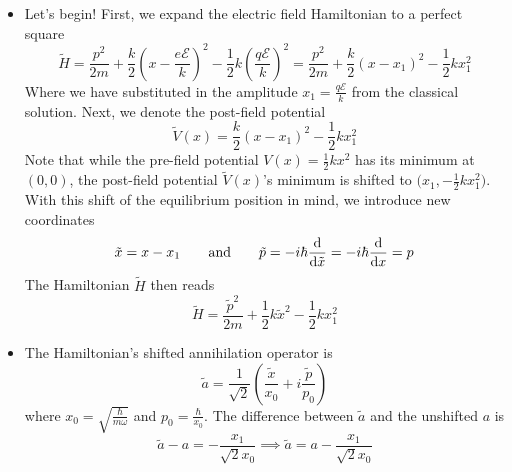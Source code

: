\documentclass[11pt, a4paper]{article}
\newcommand{\eqtext}[1]{\qquad \text{#1} \qquad}
\begin{document}
\begin{itemize}
	\item Let's begin! First, we expand the electric field Hamiltonian to a perfect square
	\begin{equation*}
		\tilde{H} = \frac{p^{2}}{2m} + \frac{k}{2}\left(x - \frac{e\mathcal{E}}{k}\right)^{2} - \frac{1}{2}k\left(\frac{q\mathcal{E}}{k}\right)^{2} = \frac{p^{2}}{2m} + \frac{k}{2}\left(x - x_{1}\right)^{2} - \frac{1}{2}kx_{1}^{2}
	\end{equation*}
	Where we have substituted in the amplitude $ x_{1} = \frac{q\mathcal{E}}{k} $ from the classical solution. Next, we denote the post-field potential
	\begin{equation*}
		\tilde{V}(x) = \frac{k}{2}\left(x - x_{1}\right)^{2} - \frac{1}{2}kx_{1}^{2}
	\end{equation*}
	Note that while the pre-field potential $ V(x) = \frac{1}{2}kx^{2} $ has its minimum at $ (0, 0) $, the post-field potential $ \tilde{V}(x) $'s minimum is shifted to $ \big(x_{1}, - \frac{1}{2}kx_{1}^{2}\big) $. With this shift of the equilibrium position in mind, we introduce new coordinates
	\begin{equation*}
		\tilde{x} = x - x_{1} \eqtext{and} \tilde{p} = - i\hbar
 		\dv{\tilde{x}} = -i \hbar \dv{x} = p
 	\end{equation*}
 	The Hamiltonian $ \tilde{H} $ then reads
 	\begin{equation*}
 		\tilde{H} = \frac{\tilde{p}^{2}}{2m} + \frac{1}{2}k\tilde{x}^{2} - \frac{1}{2}kx_{1}^{2}
 	\end{equation*}
 	
 	\item The Hamiltonian's shifted annihilation operator is
 	\begin{equation*}
 		\tilde{a} = \frac{1}{\sqrt{2}}\left(\frac{\tilde{x}}{x_{0}} + i\frac{\tilde{p}}{p_{0}}\right) 
 	\end{equation*}
 	where $ x_{0} = \sqrt{\frac{\hbar}{m\omega}}$ and $ p_{0} = \frac{\hbar}{x_{0}} $. The difference between $ \tilde{a} $  and the unshifted $ a $ is
 	\begin{equation*}
 		\tilde{a} - a = -\frac{x_{1}}{\sqrt{2}x_{0}} \implies \tilde{a} = a -\frac{x_{1}}{\sqrt{2}x_{0}}
 	\end{equation*}
 	

\end{itemize}
\end{document}
